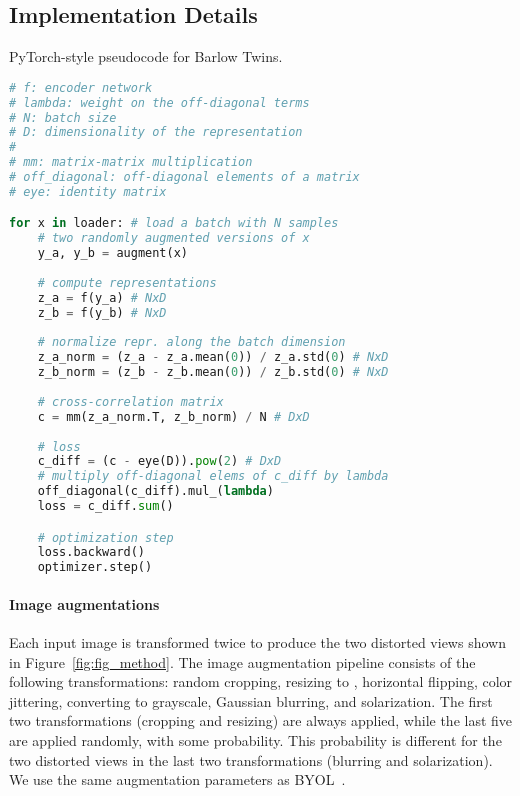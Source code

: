 \documentclass{article}
\begin{document}
\subsection{Implementation Details}
\label{sec:implementation_details}

\begin{algorithm}[tb]
   \caption{PyTorch-style pseudocode for Barlow Twins.}
   \label{alg:barlow_twins}
   
\begin{lstlisting}[language=python]
# f: encoder network
# lambda: weight on the off-diagonal terms
# N: batch size
# D: dimensionality of the representation
#
# mm: matrix-matrix multiplication
# off_diagonal: off-diagonal elements of a matrix
# eye: identity matrix

for x in loader: # load a batch with N samples
    # two randomly augmented versions of x
    y_a, y_b = augment(x)
    
    # compute representations
    z_a = f(y_a) # NxD
    z_b = f(y_b) # NxD
    
    # normalize repr. along the batch dimension
    z_a_norm = (z_a - z_a.mean(0)) / z_a.std(0) # NxD
    z_b_norm = (z_b - z_b.mean(0)) / z_b.std(0) # NxD
    
    # cross-correlation matrix
    c = mm(z_a_norm.T, z_b_norm) / N # DxD
    
    # loss
    c_diff = (c - eye(D)).pow(2) # DxD
    # multiply off-diagonal elems of c_diff by lambda
    off_diagonal(c_diff).mul_(lambda)
    loss = c_diff.sum()

    # optimization step
    loss.backward()
    optimizer.step()
\end{lstlisting}
\end{algorithm}



\paragraph{Image augmentations} Each input image is transformed twice to produce the two distorted views shown in Figure~\ref{fig:fig_method}. The image augmentation pipeline consists of the following transformations: random cropping, resizing to , horizontal flipping, color jittering, converting to grayscale, Gaussian blurring, and solarization. The first two transformations (cropping and resizing) are always applied, while the last five are applied randomly, with some probability. This probability is different for the two distorted views in the last two transformations (blurring and solarization). We use the same augmentation parameters as \textsc{BYOL}~\cite{grill2020bootstrap}.
\end{document}
